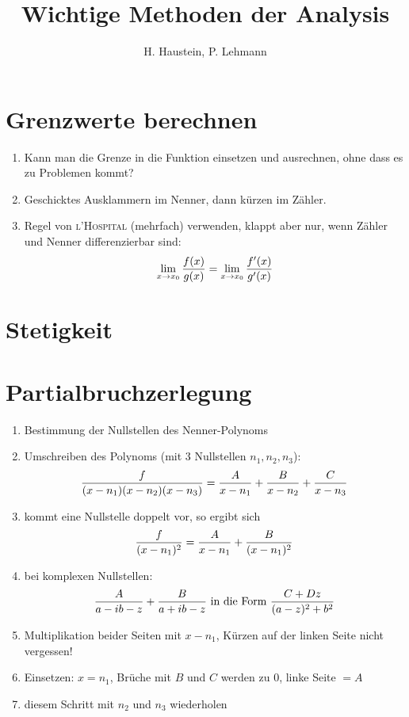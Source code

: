 \documentclass[ngerman,a4paper]{article}
\title{\textbf{Wichtige Methoden der Analysis}}
\author{H. Haustein, P. Lehmann}
\begin{document}
\maketitle

\section{Grenzwerte berechnen}
\begin{enumerate}[label=\textbf{\arabic*.}]
	\item Kann man die Grenze in die Funktion einsetzen und ausrechnen, ohne dass es zu Problemen kommt? 
	\item Geschicktes Ausklammern im Nenner, dann kürzen im Zähler.
	\item Regel von \textsc{l'Hospital} (mehrfach) verwenden, klappt aber nur, wenn Zähler und Nenner differenzierbar sind:
	\begin{align}
	\lim\limits_{x\to x_0}\frac{f(x)}{g(x)}=\lim\limits_{x\to x_0}\frac{f'(x)}{g'(x)}\notag
	\end{align}
\end{enumerate}

\section{Stetigkeit}

\section{Partialbruchzerlegung}
\begin{enumerate}[label=\textbf{\arabic*.}]
	\item Bestimmung der Nullstellen des Nenner-Polynoms
	\item Umschreiben des Polynoms (mit 3 Nullstellen $n_1,n_2,n_3$):
	\begin{align}
		\frac{f}{(x-n_1)(x-n_2)(x-n_3)}=\frac{A}{x-n_1}+\frac{B}{x-n_2}+\frac{C}{x-n_3}\notag
	\end{align}
	\item kommt eine Nullstelle doppelt vor, so ergibt sich
	\begin{align}
		\frac{f}{(x-n_1)^2}=\frac{A}{x-n_1}+\frac{B}{(x-n_1)^2}\notag
	\end{align}
	\item bei komplexen Nullstellen:
	\begin{align}
		\frac{A}{a-ib-z}+\frac{B}{a+ib-z} \text{ in die Form } \frac{C+Dz}{(a-z)^2+b^2}\notag
	\end{align}
	\item Multiplikation beider Seiten mit $x-n_1$, Kürzen auf der linken Seite nicht vergessen!
	\item Einsetzen: $x=n_1$, Brüche mit $B$ und $C$ werden zu 0, linke Seite $= A$
	\item diesem Schritt mit $n_2$ und $n_3$ wiederholen
\end{enumerate}
\end{document}
